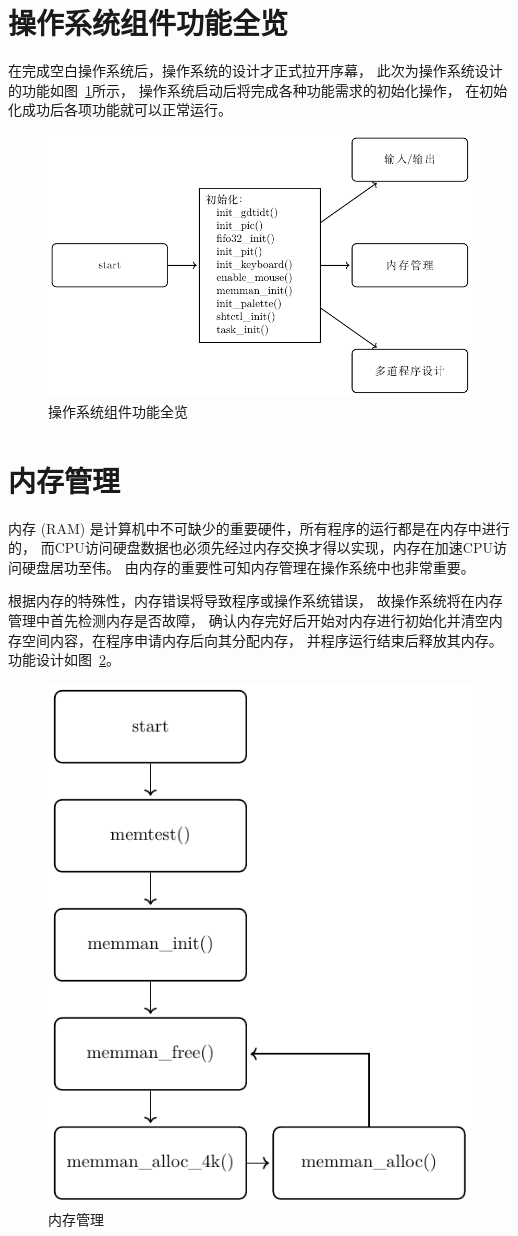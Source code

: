 \section{操作系统组件功能全览}
在完成空白操作系统后，操作系统的设计才正式拉开序幕，
此次为操作系统设计的功能如图~\ref{fig:run}所示，
操作系统启动后将完成各种功能需求的初始化操作，
在初始化成功后各项功能就可以正常运行。

\begin{figure}[H]
  \centering
  \includegraphics[width=.8\textwidth]{fig/func/run.pdf}
  \caption{操作系统组件功能全览}
  \label{fig:run}
\end{figure}

\section{内存管理}

内存 (RAM) 是计算机中不可缺少的重要硬件，所有程序的运行都是在内存中进行的，
而CPU访问硬盘数据也必须先经过内存交换才得以实现，内存在加速CPU访问硬盘居功至伟。
由内存的重要性可知内存管理在操作系统中也非常重要。	

根据内存的特殊性，内存错误将导致程序或操作系统错误，
故操作系统将在内存管理中首先检测内存是否故障，
确认内存完好后开始对内存进行初始化并清空内存空间内容，在程序申请内存后向其分配内存，
并程序运行结束后释放其内存。功能设计如图~\ref{fig:memman}。
\begin{figure}[H]
  \centering
  \includegraphics[width=.5\textwidth]{fig/func/memman.pdf}
  \caption{内存管理}
  \label{fig:memman}
\end{figure}

